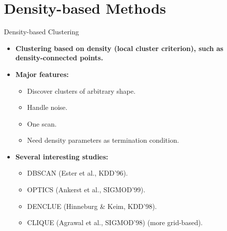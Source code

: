 \section{Density-based Methods}

\begin{frame}{Density-based Clustering}
	\begin{itemize}
		\item \textbf{Clustering based on density (local cluster criterion), 
		such as density-connected points.}
		\item \textbf{Major features:}
		\begin{itemize}
			\item Discover clusters of arbitrary shape.
			\item Handle noise.
			\item One scan.
			\item Need density parameters as termination condition.
		\end{itemize}
		\item \textbf{Several interesting studies:}
		\begin{itemize}
			\item DBSCAN (Ester et al., KDD'96).
			\item OPTICS (Ankerst et al., SIGMOD'99).
			\item DENCLUE (Hinneburg \& Keim, KDD'98).
			\item CLIQUE (Agrawal et al., SIGMOD'98) (more grid-based).
		\end{itemize}
	\end{itemize}
\end{frame}

